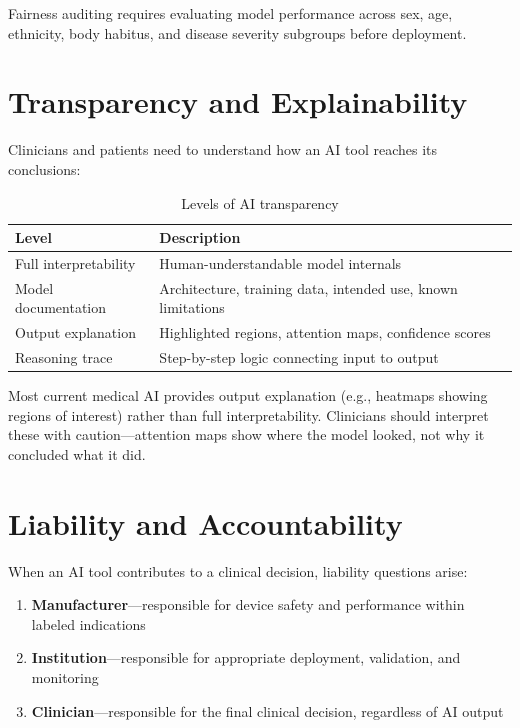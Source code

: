 Fairness auditing requires evaluating model performance across sex, age, ethnicity, body habitus, and disease severity subgroups before deployment.

\section{Transparency and Explainability}
Clinicians and patients need to understand how an AI tool reaches its conclusions:

\begin{table}[ht]
\centering
\caption{Levels of AI transparency}
\label{tab:ai_transparency}
\begin{tabular}{@{}p{}p{}@{}}
\toprule
\textbf{Level} & \textbf{Description} \\
\midrule
Full interpretability & Human-understandable model internals \\
Model documentation & Architecture, training data, intended use, known limitations \\
Output explanation & Highlighted regions, attention maps, confidence scores \\
Reasoning trace & Step-by-step logic connecting input to output \\
\bottomrule
\end{tabular}
\end{table}

Most current medical AI provides output explanation (e.g., heatmaps showing regions of interest) rather than full interpretability. Clinicians should interpret these with caution---attention maps show where the model looked, not why it concluded what it did.

\section{Liability and Accountability}
When an AI tool contributes to a clinical decision, liability questions arise:
\begin{enumerate}
    \item \textbf{Manufacturer}---responsible for device safety and performance within labeled indications
    \item \textbf{Institution}---responsible for appropriate deployment, validation, and monitoring
    \item \textbf{Clinician}---responsible for the final clinical decision, regardless of AI output
\end{enumerate}

